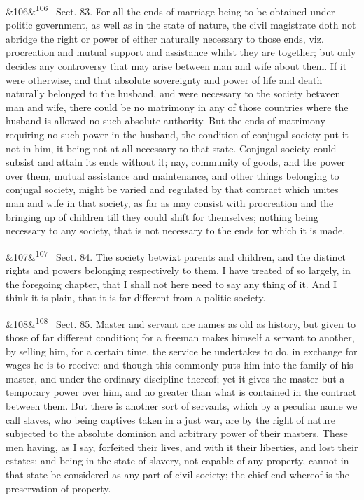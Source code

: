 \documentclass[12pt]{article}
\newcommand{\para}[1][]{\par\noindent\ifx&#1&\else\textsuperscript{\footnotesize #1}~\fi}
\begin{document}
\para[106] Sect. 83. For all the ends of marriage being to be obtained under politic government, as well as in the state of nature, the civil magistrate doth not abridge the right or power of either naturally necessary to those ends, viz. procreation and mutual support and assistance whilst they are together; but only decides any controversy that may arise between man and wife about them. If it were otherwise, and that absolute sovereignty and power of life and death naturally belonged to the husband, and were necessary to the society between man and wife, there could be no matrimony in any of those countries where the husband is allowed no such absolute authority. But the ends of matrimony requiring no such power in the husband, the condition of conjugal society put it not in him, it being not at all necessary to that state. Conjugal society could subsist and attain its ends without it; nay, community of goods, and the power over them, mutual assistance and maintenance, and other things belonging to conjugal society, might be varied and regulated by that contract which unites man and wife in that society, as far as may consist with procreation and the bringing up of children till they could shift for themselves; nothing being necessary to any society, that is not necessary to the ends for which it is made.

\para[107] Sect. 84. The society betwixt parents and children, and the distinct rights and powers belonging respectively to them, I have treated of so largely, in the foregoing chapter, that I shall not here need to say any thing of it. And I think it is plain, that it is far different from a politic society.

\para[108] Sect. 85. Master and servant are names as old as history, but given to those of far different condition; for a freeman makes himself a servant to another, by selling him, for a certain time, the service he undertakes to do, in exchange for wages he is to receive: and though this commonly puts him into the family of his master, and under the ordinary discipline thereof; yet it gives the master but a temporary power over him, and no greater than what is contained in the contract between them. But there is another sort of servants, which by a peculiar name we call slaves, who being captives taken in a just war, are by the right of nature subjected to the absolute dominion and arbitrary power of their masters. These men having, as I say, forfeited their lives, and with it their liberties, and lost their estates; and being in the state of slavery, not capable of any property, cannot in that state be considered as any part of civil society; the chief end whereof is the preservation of property.
\end{document}
